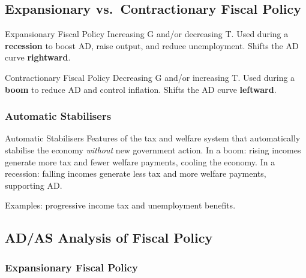 \documentclass[11pt, a4paper, twoside]{book}
\begin{document}
\subsection{Expansionary vs.\ Contractionary Fiscal Policy}

\begin{keyterm}{Expansionary Fiscal Policy}
Increasing G and/or decreasing T. Used during a \textbf{recession} to boost AD, raise output, and reduce unemployment. Shifts the AD curve \textbf{rightward}.
\end{keyterm}

\begin{keyterm}{Contractionary Fiscal Policy}
Decreasing G and/or increasing T. Used during a \textbf{boom} to reduce AD and control inflation. Shifts the AD curve \textbf{leftward}.
\end{keyterm}

\subsubsection{Automatic Stabilisers}

\begin{keyterm}{Automatic Stabilisers}
Features of the tax and welfare system that automatically stabilise the economy \emph{without} new government action. In a boom: rising incomes generate more tax and fewer welfare payments, cooling the economy. In a recession: falling incomes generate less tax and more welfare payments, supporting AD.
\end{keyterm}

Examples: progressive income tax and unemployment benefits.

\subsection{AD/AS Analysis of Fiscal Policy}

\subsubsection{Expansionary Fiscal Policy}
\end{document}
